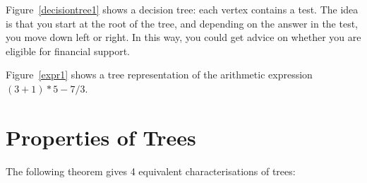 Figure~\ref{decisiontree1} shows a decision tree: each vertex
contains a test. The idea is that you start at the root of the tree,
and depending on the answer in the test, you move down left or
right. In this way, you could get advice on whether you are eligible
for financial support.


Figure~\ref{expr1} shows a tree representation of the arithmetic
expression $(3+1) *5 - 7/3$.

\section{Properties of Trees}

The following theorem gives 4 equivalent characterisations of trees:

